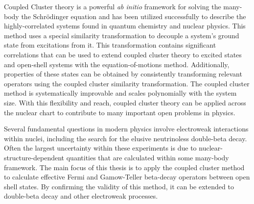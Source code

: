 \documentclass[../thesis.tex]{subfiles}
\begin{document}
Coupled Cluster theory is a powerful \emph{ab initio} framework for solving the many-body the Schr\"{o}dinger equation and has been utilized successfully to describe the highly-correlated systems found in quantum chemistry and nuclear physics.  This method uses a special similarity transformation to decouple a system's ground state from excitations from it.  This transformation contains significant correlations that can be used to extend coupled cluster theory to excited states and open-shell systems with the equation-of-motions method.  Additionally, properties of these states can be obtained by consistently transforming relevant operators using the coupled cluster similarity transformation.  The coupled cluster method is systematically improvable and scales polynomially with the system size.  With this flexibility and reach, coupled cluster theory can be applied across the nuclear chart to contribute to many important open problems in physics.

Several fundamental questions in modern physics involve electroweak interactions within nuclei, including the search for the elusive neutrinoless double-beta decay.  Often the largest uncertainty within these experiments is due to nuclear-structure-dependent quantities that are calculated within some many-body framework.  The main focus of this thesis is to apply the coupled cluster method to calculate effective Fermi and Gamow-Teller beta-decay operators between open shell states.  By confirming the validity of this method, it can be extended to double-beta decay and other electroweak processes.
\end{document}
